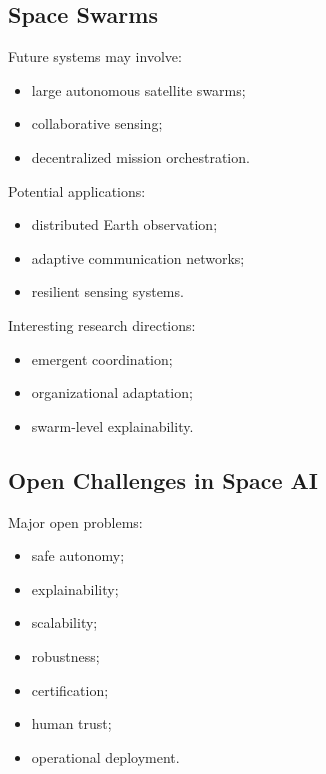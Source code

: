 \documentclass[10pt,a4paper,twocolumn]{article}
\begin{document}

\subsection{Space Swarms}

Future systems may involve:
\begin{itemize}
    \item large autonomous satellite swarms;
    \item collaborative sensing;
    \item decentralized mission orchestration.
\end{itemize}

Potential applications:
\begin{itemize}
    \item distributed Earth observation;
    \item adaptive communication networks;
    \item resilient sensing systems.
\end{itemize}

Interesting research directions:
\begin{itemize}
    \item emergent coordination;
    \item organizational adaptation;
    \item swarm-level explainability.
\end{itemize}


\subsection{Open Challenges in Space AI}

Major open problems:
\begin{itemize}
    \item safe autonomy;
    \item explainability;
    \item scalability;
    \item robustness;
    \item certification;
    \item human trust;
    \item operational deployment.
\end{itemize}
\end{document}
